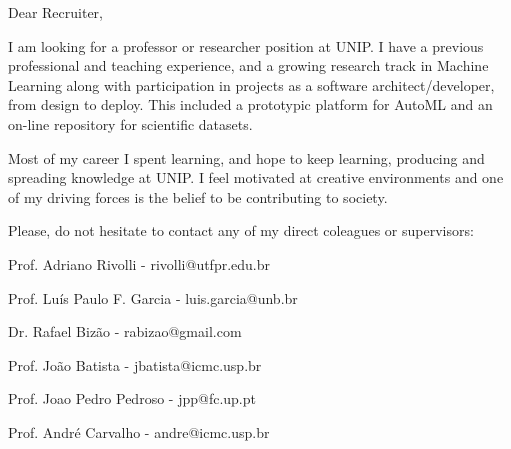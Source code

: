 \documentclass[letterpaper,11pt]{article}
\begin{document}
\vspace{40pt}

{\justifying
\Large
{}
Dear Recruiter,
\vspace{10pt}

% 

I am looking for a professor or researcher position at UNIP.
I have a previous professional and teaching experience, and a growing research track in Machine Learning along with participation in projects as a software architect/developer, from design to deploy.
This included a prototypic platform for AutoML and an on-line repository for scientific datasets.

}

{\justifying
\Large
{}

Most of my career I spent learning, and hope to keep learning, producing and spreading knowledge at UNIP.
I feel motivated at creative environments and one of my driving forces is the belief to be contributing to society.

\vspace{20pt}

Please, do not hesitate to contact any of my direct coleagues or supervisors:

Prof. Adriano Rivolli - rivolli@utfpr.edu.br

Prof. Luís Paulo F. Garcia - luis.garcia@unb.br

Dr. Rafael Bizão - rabizao@gmail.com

Prof. João Batista - jbatista@icmc.usp.br

Prof. Joao Pedro Pedroso - jpp@fc.up.pt

Prof. André Carvalho - andre@icmc.usp.br

}
\end{document}
